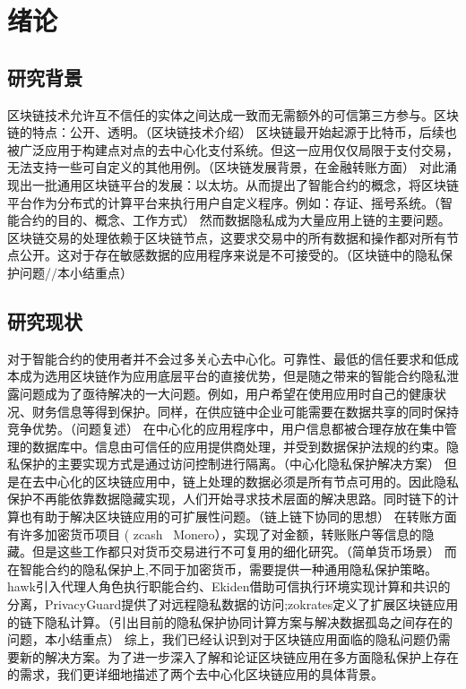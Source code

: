 \chapter{绪论}

\section{研究背景}

区块链技术允许互不信任的实体之间达成一致而无需额外的可信第三方参与。区块链的特点：公开、透明。（区块链技术介绍）
区块链最开始起源于比特币，后续也被广泛应用于构建点对点的去中心化支付系统。但这一应用仅仅局限于支付交易，无法支持一些可自定义的其他用例。（区块链发展背景，在金融转账方面）
对此涌现出一批通用区块链平台的发展：以太坊。从而提出了智能合约的概念，将区块链平台作为分布式的计算平台来执行用户自定义程序。例如：存证、摇号系统。（智能合约的目的、概念、工作方式）
然而数据隐私成为大量应用上链的主要问题。区块链交易的处理依赖于区块链节点，这要求交易中的所有数据和操作都对所有节点公开。这对于存在敏感数据的应用程序来说是不可接受的。（区块链中的隐私保护问题//本小结重点）
\section{研究现状}

对于智能合约的使用者并不会过多关心去中心化。可靠性、最低的信任要求和低成本成为选用区块链作为应用底层平台的直接优势，但是随之带来的智能合约隐私泄露问题成为了亟待解决的一大问题。例如，用户希望在使用应用时自己的健康状况、财务信息等得到保护。同样，在供应链中企业可能需要在数据共享的同时保持竞争优势。（问题复述）
在中心化的应用程序中，用户信息都被合理存放在集中管理的数据库中。信息由可信任的应用提供商处理，并受到数据保护法规的约束。隐私保护的主要实现方式是通过访问控制进行隔离。（中心化隐私保护解决方案）
但是在去中心化的区块链应用中，链上处理的数据必须是所有节点可用的。因此隐私保护不再能依靠数据隐藏实现，人们开始寻求技术层面的解决思路。同时链下的计算也有助于解决区块链应用的可扩展性问题。（链上链下协同的思想）
在转账方面有许多加密货币项目 ( zcash \ Monero），实现了对金额，转账账户等信息的隐藏。但是这些工作都只对货币交易进行不可复用的细化研究。（简单货币场景）
而在智能合约的隐私保护上,不同于加密货币，需要提供一种通用隐私保护策略。hawk引入代理人角色执行职能合约、Ekiden借助可信执行环境实现计算和共识的分离，PrivacyGuard提供了对远程隐私数据的访问;zokrates定义了扩展区块链应用的链下隐私计算。（引出目前的隐私保护协同计算方案与解决数据孤岛之间存在的问题，本小结重点）
综上，我们已经认识到对于区块链应用面临的隐私问题仍需要新的解决方案。为了进一步深入了解和论证区块链应用在多方面隐私保护上存在的需求，我们更详细地描述了两个去中心化区块链应用的具体背景。

